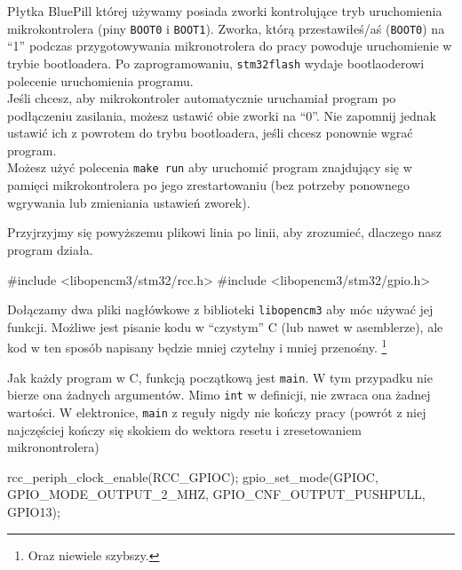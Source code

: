 \begin{ProTip}{}
  Płytka BluePill której używamy posiada zworki kontrolujące tryb uruchomienia mikrokontrolera (piny \Verb$BOOT0$ i \Verb$BOOT1$).
  Zworka, którą przestawiłeś/aś (\Verb$BOOT0$) na ``1'' podczas przygotowywania mikronotrolera do pracy powoduje uruchomienie w
  trybie bootloadera. Po zaprogramowaniu, \Verb$stm32flash$ wydaje bootlaoderowi polecenie uruchomienia programu.\\
  
  Jeśli chcesz, aby mikrokontroler automatycznie uruchamiał program po podłączeniu zasilania, możesz ustawić obie zworki na ``0''. Nie zapomnij
  jednak ustawić ich z powrotem do trybu bootloadera, jeśli chcesz ponownie wgrać program.\\
  
  Możesz użyć polecenia \Verb$make run$ aby uruchomić program znajdujący się w pamięci mikrokontrolera po jego zrestartowaniu (bez potrzeby ponownego wgrywania lub zmieniania ustawień zworek).
\end{ProTip}

Przyjrzyjmy się powyższemu plikowi linia po linii, aby zrozumieć, dlaczego nasz program działa.

\begin{CodeFrame*}[c]{}
#include <libopencm3/stm32/rcc.h>
#include <libopencm3/stm32/gpio.h>

\end{CodeFrame*}

Dołączamy dwa pliki nagłówkowe z biblioteki \Verb$libopencm3$ aby móc używać jej funkcji. Możliwe jest pisanie kodu w ``czystym'' C
(lub nawet w asemblerze), ale kod w ten sposób napisany będzie mniej czytelny i mniej przenośny.
\footnote{Oraz niewiele szybszy.}

\begin{CodeFrame*}[c]{}
int main() { 
\end{CodeFrame*}

Jak każdy program w C, funkcją początkową jest \verb$main$. W tym przypadku nie bierze ona żadnych argumentów. Mimo \Verb$int$ w
definicji, nie zwraca ona żadnej wartości. W elektronice, \Verb$main$ z reguły nigdy nie kończy pracy (powrót z niej najczęściej
kończy się skokiem do wektora resetu i zresetowaniem mikronontrolera)

\begin{CodeFrame*}[c]{}
  rcc_periph_clock_enable(RCC_GPIOC);
  gpio_set_mode(GPIOC, GPIO_MODE_OUTPUT_2_MHZ, GPIO_CNF_OUTPUT_PUSHPULL, GPIO13);
\end{CodeFrame*}

